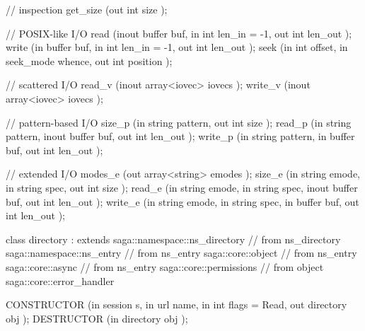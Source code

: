 \begin{myspec}
{{      // inspection
      get_size    (out   int               size     );
 
      // POSIX-like I/O
      read        (inout buffer            buf,
                   in    int               len_in = -1,
                   out   int               len_out  );
      write       (in    buffer            buf,
                   in    int               len_in = -1,
                   out   int               len_out  );
      seek        (in    int               offset,
                   in    seek_mode         whence,
                   out   int               position );
 
      // scattered I/O
      read_v      (inout array<iovec>      iovecs  );
      write_v     (inout array<iovec>      iovecs  );
 
      // pattern-based I/O
      size_p      (in    string            pattern,
                   out   int               size     );
      read_p      (in    string            pattern,
                   inout buffer            buf, 
                   out   int               len_out  );
      write_p     (in    string            pattern,
                   in    buffer            buf, 
                   out   int               len_out  );
 
      // extended I/O
      modes_e     (out   array<string>     emodes   );
      size_e      (in    string            emode,
                   in    string            spec,
                   out   int               size     );
      read_e      (in    string            emode,
                   in    string            spec,
                   inout buffer            buf,
                   out   int               len_out  );
      write_e     (in    string            emode,
                   in    string            spec,
                   in    buffer            buf,
                   out   int               len_out  );
    }
 
 
    class directory : extends            saga::namespace::ns_directory
                   // from ns_directory  saga::namespace::ns_entry
                   // from ns_entry      saga::core::object
                   // from ns_entry      saga::core::async
                   // from ns_entry      saga::core::permissions
                   // from object        saga::core::error_handler
    {
      CONSTRUCTOR (in    session           s,
                   in    url               name,
                   in    int               flags = Read,
                   out   directory         obj      );
      DESTRUCTOR  (in    directory         obj      );
 
}}
\end{myspec}
